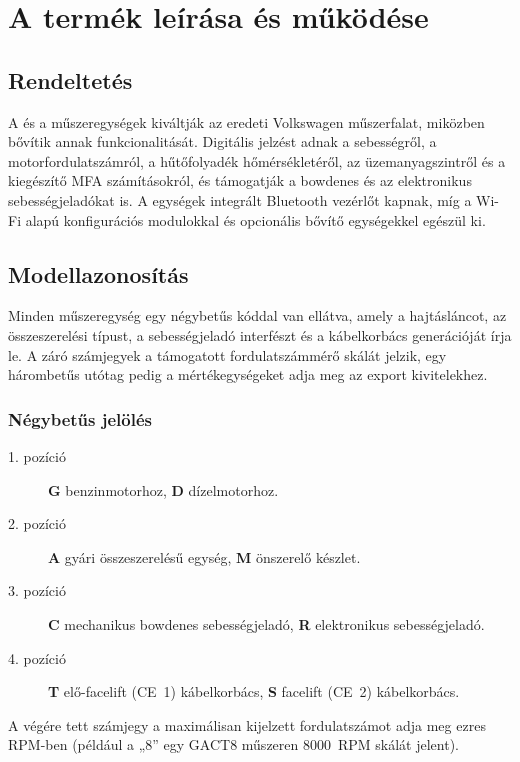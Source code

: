 \chapter{A termék leírása és működése}\label{ch:description}

\section{Rendeltetés}
A \ReplicaGenOne{} és a \ReplicaNextLong{} műszeregységek kiváltják az eredeti Volkswagen műszerfalat, miközben bővítik annak funkcionalitását. Digitális jelzést adnak a sebességről, a motorfordulatszámról, a hűtőfolyadék hőmérsékletéről, az üzemanyagszintről és a kiegészítő MFA számításokról, és támogatják a bowdenes és az elektronikus sebességjeladókat is. A \ReplicaGenOneShort{} egységek integrált Bluetooth vezérlőt kapnak, míg a \ReplicaNextShort{} Wi-Fi alapú konfigurációs modulokkal és opcionális bővítő egységekkel egészül ki.

\section{Modellazonosítás}
Minden műszeregység egy négybetűs kóddal van ellátva, amely a hajtásláncot, az összeszerelési típust, a sebességjeladó interfészt és a kábelkorbács generációját írja le. A záró számjegyek a támogatott fordulatszámmérő skálát jelzik, egy hárombetűs utótag pedig a mértékegységeket adja meg az export kivitelekhez.

\subsection{Négybetűs jelölés}
\begin{description}
    \item[1. pozíció] \textbf{G} benzinmotorhoz, \textbf{D} dízelmotorhoz.
    \item[2. pozíció] \textbf{A} gyári összeszerelésű egység, \textbf{M} önszerelő készlet.
    \item[3. pozíció] \textbf{C} mechanikus bowdenes sebességjeladó, \textbf{R} elektronikus sebességjeladó.
    \item[4. pozíció] \textbf{T} elő-facelift (CE~1) kábelkorbács, \textbf{S} facelift (CE~2) kábelkorbács.
\end{description}
A végére tett számjegy a maximálisan kijelzett fordulatszámot adja meg ezres RPM-ben (például a „8” egy GACT8 műszeren 8000~RPM skálát jelent).

